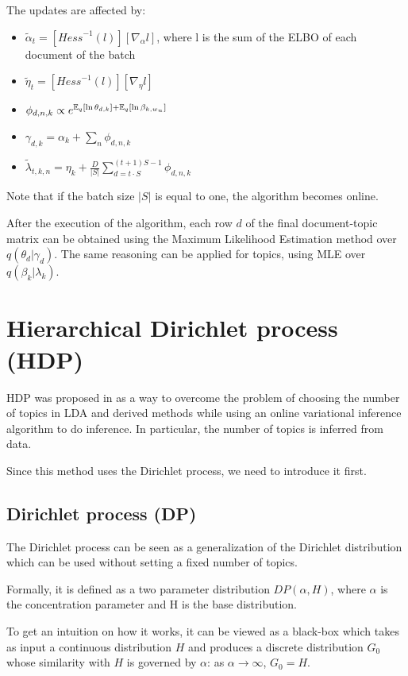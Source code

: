The updates are affected by:
\begin{itemize}
    \item $\tilde{\alpha}_t = [\mathit{Hess}^{-1}(l)] [\nabla_{\alpha} l]$, where l is the sum of the ELBO of each document of the batch
    \item $\tilde{\eta}_t = [\mathit{Hess}^{-1}(l)] [\nabla_{\eta} l]$
    \item $\phi_{d,n,k} \propto e^{\operatorname*{\mathbb{E}}_q[\ln \theta_{d,k}] + \operatorname*{\mathbb{E}}_q[\ln \beta_{k, w_n}]}$
    \item $\gamma_{d,k} = \alpha_k + \sum_n \phi_{d,n,k}$
    \item $\tilde{\lambda}_{t,k,n} = \eta_k + \frac{D}{|S|} \sum_{d = t \cdot S}^{(t+1) S - 1} \phi_{d,n,k} $
\end{itemize}

Note that if the batch size $|S|$ is equal to one, the algorithm becomes online.

After the execution of the algorithm, each row $d$ of the final document-topic matrix
can be obtained using the Maximum Likelihood Estimation method over $q(\theta_d | \gamma_d)$.
The same reasoning can be applied for topics, using MLE over $q(\beta_k | \lambda_k)$.


\section{Hierarchical Dirichlet process (HDP)}

HDP was proposed in \cite{DBLP:journals/jmlr/WangPB11} as a way to overcome the problem of choosing the number of topics in LDA and derived methods
while using an online variational inference algorithm to do inference.
In particular, the number of topics is inferred from data.

Since this method uses the Dirichlet process, we need to introduce it first.

\subsection{Dirichlet process (DP)} \label{dipro}
The Dirichlet process can be seen as a generalization of the Dirichlet distribution
which can be used without setting a fixed number of topics.

Formally, it is defined as a two parameter distribution $\mathit{DP}(\alpha, H)$,
where $\alpha$ is the concentration parameter and H is the base distribution.

To get an intuition on how it works, it can be viewed as a black-box
which takes as input a continuous distribution $H$ and produces a discrete distribution $G_0$
whose similarity with $H$ is governed by $\alpha$: as $\alpha \to \infty$, $G_0 = H$.

